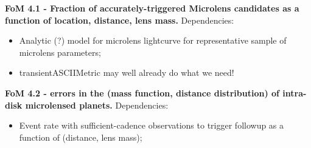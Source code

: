 %



{\bf FoM 4.1 - Fraction of accurately-triggered Microlens candidates as a function of location, distance, lens mass.}
Dependencies:
\begin{itemize}
  \item Analytic (?) model for microlens lightcurve for representative sample of microlens parameters;
    \item transientASCIIMetric may well already do what we need! 
\end{itemize}

{\bf FoM 4.2 - errors in the (mass function, distance distribution) of intra-disk microlensed planets.}
Dependencies:
\begin{itemize}
  \item Event rate with sufficient-cadence observations to trigger followup as a function of (distance, lens mass);
\end{itemize}


